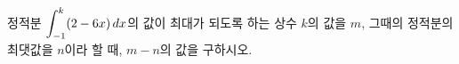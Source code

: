 정적분 $\displaystyle\int_{-1}^{k}(2-6x)\mkern3mu dx$의 값이 최대가 되도록 하는 상수 $k$의 값을 $m$, 그때의 정적분의 최댓값을 $n$이라 할 때, $m-n$의 값을 구하시오.
